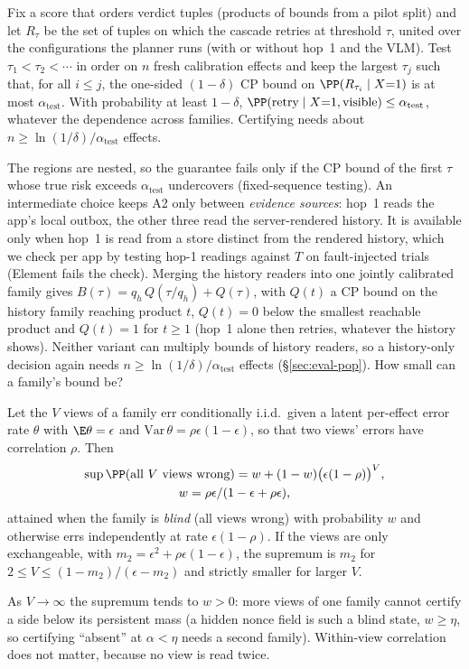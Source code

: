 \begin{proposition}
\label{prop:joint}
Fix a score that orders verdict tuples (products of bounds from a pilot split) and let $R_\tau$ be the set of tuples on which the cascade retries at threshold $\tau$, united
over the configurations the planner runs (with or without hop~1 and the VLM). Test $\tau_1<\tau_2<\cdots$ in order on $n$ fresh calibration effects and keep the largest
$\tau_j$ such that, for all $i\le j$, the one-sided $(1-\delta)$ CP bound on $\PP(R_{\tau_i}\mid X{=}1)$ is at most $\alpha_{\mathrm{test}}$. With probability at least $1-\delta$,
$\PP(\text{retry}\mid X{=}1,\text{visible})\le\alpha_{\mathrm{test}}$, whatever the dependence across families. Certifying needs about $n\ge\ln(1/\delta)/\alpha_{\mathrm{test}}$ effects.
\end{proposition}
The regions are nested, so the guarantee fails only if the CP bound of the first $\tau$ whose true risk exceeds $\alpha_{\mathrm{test}}$ undercovers (fixed-sequence testing).
An intermediate choice keeps A2 only between \emph{evidence sources}: hop~1 reads the app's local outbox, the other three read the server-rendered history. It is available
only when hop~1 is read from a store distinct from the rendered history, which we check per app by testing hop-1 readings against $T$ on fault-injected trials (Element fails
the check). Merging the history readers into one jointly calibrated family gives $B(\tau)=q_h\,Q(\tau/q_h)+Q(\tau)$, with $Q(t)$ a CP bound on the history family reaching
product $t$, $Q(t)=0$ below the smallest reachable product and $Q(t)=1$ for $t\ge1$ (hop~1 alone then retries, whatever the history shows). Neither variant can multiply bounds of history readers, so a history-only decision again needs $n\ge\ln(1/\delta)/\alpha_{\mathrm{test}}$ effects
(\S\ref{sec:eval-pop}). How small can a family's bound be?

\begin{lemma}
\label{lem:floor}
Let the $V$ views of a family err conditionally i.i.d.\ given a latent per-effect error rate $\theta$ with $\E\theta=\epsilon$ and $\mathrm{Var}\,\theta=\rho\epsilon(1-\epsilon)$,
so that two views' errors have correlation $\rho$. Then
\begin{gather*}
\sup\PP(\text{all $V$ views wrong})=w+(1-w)\big(\epsilon(1-\rho)\big)^V,\\
w=\rho\epsilon/(1-\epsilon+\rho\epsilon),
\end{gather*}
attained when the family is \emph{blind} (all views wrong) with probability $w$ and otherwise errs independently at rate $\epsilon(1-\rho)$.
If the views are only exchangeable, with $m_2=\epsilon^2+\rho\epsilon(1-\epsilon)$, the supremum is $m_2$ for $2\le V\le(1-m_2)/(\epsilon-m_2)$ and strictly smaller for larger $V$.
\end{lemma}
As $V\to\infty$ the supremum tends to $w>0$: more views of one family cannot certify a side below its persistent mass (a hidden nonce field is such a blind state, $w\ge\eta$,
so certifying ``absent'' at $\alpha<\eta$ needs a second family). Within-view correlation does not matter, because no view is read twice.

